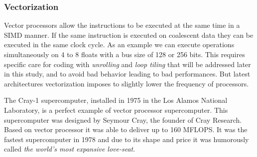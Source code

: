 \subsubsection{Vectorization} 
Vector processors allow the instructions to be executed at the same time in a SIMD manner. 
If the same instruction is executed on coalescent data they can be executed in the same clock cycle. 
As an example we can execute operations simultaneously on 4 to 8 floats with a bus size of 128 or 256 bits.
This requires specific care for coding with \textit{unrolling} and \textit{loop tiling} that will be addressed later in this study, and to avoid bad behavior leading to bad performances.
But latest architectures vectorization imposes to slightly lower the frequency of processors. 

The Cray-1 supercomputer\cite{russell1978cray}, installed in 1975 in the Los Alamos National Laboratory, is a perfect example of vector processor supercomputer.
This supercomputer was designed by Seymour Cray, the founder of Cray Research.
Based on vector processor it was able to deliver up to 160 MFLOPS.
It was the fastest supercomputer in 1978 and due to its shape and price it was humorously called \textit{the world's most expansive love-seat}. 

